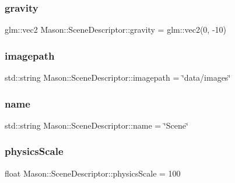 \hypertarget{class_mason_1_1_scene_descriptor_a7d9c12b3d2176d2012a22824113c7b56}{}\label{class_mason_1_1_scene_descriptor_a7d9c12b3d2176d2012a22824113c7b56} 
\subsubsection{\texorpdfstring{gravity}{gravity}}
{\footnotesize\ttfamily glm\+::vec2 Mason\+::\+Scene\+Descriptor\+::gravity = glm\+::vec2(0, -\/10)}

\hypertarget{class_mason_1_1_scene_descriptor_a32d312e0bb11e5e3f5419f5d3a6d002a}{}\label{class_mason_1_1_scene_descriptor_a32d312e0bb11e5e3f5419f5d3a6d002a} 
\subsubsection{\texorpdfstring{imagepath}{imagepath}}
{\footnotesize\ttfamily std\+::string Mason\+::\+Scene\+Descriptor\+::imagepath = \char`\"{}data/images\char`\"{}}

\hypertarget{class_mason_1_1_scene_descriptor_a847493eddb3e379f1b8e9308f2de8eb0}{}\label{class_mason_1_1_scene_descriptor_a847493eddb3e379f1b8e9308f2de8eb0} 
\subsubsection{\texorpdfstring{name}{name}}
{\footnotesize\ttfamily std\+::string Mason\+::\+Scene\+Descriptor\+::name = \char`\"{}Scene\char`\"{}}

\hypertarget{class_mason_1_1_scene_descriptor_a800b682b3cadc6d6830e9bf23f01c958}{}\label{class_mason_1_1_scene_descriptor_a800b682b3cadc6d6830e9bf23f01c958} 
\subsubsection{\texorpdfstring{physics\+Scale}{physicsScale}}
{\footnotesize\ttfamily float Mason\+::\+Scene\+Descriptor\+::physics\+Scale = 100}

